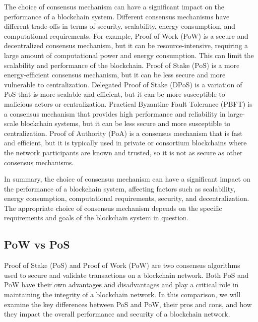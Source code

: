 \documentclass[target=mst,aauheader=]{thud}
\begin{document}
    The choice of consensus mechanism can have a significant impact on the performance of a blockchain system. Different consensus mechanisms have different trade-offs in terms of security, scalability, energy consumption, and computational requirements. For example, Proof of Work (PoW) is a secure and decentralized consensus mechanism, but it can be resource-intensive, requiring a large amount of computational power and energy consumption. This can limit the scalability and performance of the blockchain. Proof of Stake (PoS) is a more energy-efficient consensus mechanism, but it can be less secure and more vulnerable to centralization. Delegated Proof of Stake (DPoS) is a variation of PoS that is more scalable and efficient, but it can be more susceptible to malicious actors or centralization. Practical Byzantine Fault Tolerance (PBFT) is a consensus mechanism that provides high performance and reliability in large-scale blockchain systems, but it can be less secure and more susceptible to centralization. Proof of Authority (PoA) is a consensus mechanism that is fast and efficient, but it is typically used in private or consortium blockchains where the network participants are known and trusted, so it is not as secure as other consensus mechanisms.\par
    In summary, the choice of consensus mechanism can have a significant impact on the performance of a blockchain system, affecting factors such as scalability, energy consumption, computational requirements, security, and decentralization. The appropriate choice of consensus mechanism depends on the specific requirements and goals of the blockchain system in question.

    \subsection{PoW vs PoS}

    Proof of Stake (PoS) and Proof of Work (PoW) are two consensus algorithms used to secure and validate transactions on a blockchain network. Both PoS and PoW have their own advantages and disadvantages and play a critical role in maintaining the integrity of a blockchain network. In this comparison, we will examine the key differences between PoS and PoW, their pros and cons, and how they impact the overall performance and security of a blockchain network.\par
\end{document}
